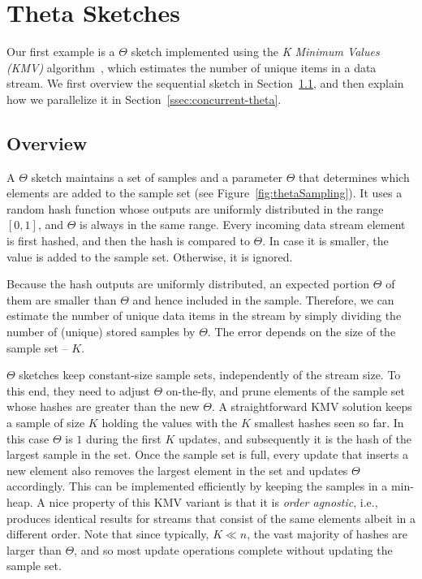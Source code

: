 \section{Theta Sketches}
\label{sec:theta}

Our first example is a $\Theta$ sketch implemented using  the 
\emph{K Minimum Values  (KMV)} algorithm~\cite{KMV}, 
which estimates the number of unique items in a data stream. 
We first overview the sequential  sketch in Section~\ref{ssec:theta-overview}, 
and then explain how we parallelize it in Section~\ref{ssec:concurrent-theta}.

\subsection{Overview}
\label{ssec:theta-overview}


A $\Theta$ sketch maintains a set of samples and a parameter $\Theta$
that determines which elements are added to the sample set (see Figure~\ref{fig:thetaSampling}). 
It uses a random hash function whose outputs are uniformly distributed
in the range $[0,1]$, and $\Theta$ is always in the same range.  
Every incoming data stream element is first hashed, and then the hash is compared to $\Theta$. 
In case it is smaller, the value is added to the sample set.  Otherwise, it is ignored. 

Because the hash outputs are uniformly distributed, an expected
portion $\Theta$ of them are smaller than $\Theta$ and hence included in the sample. 
Therefore, we can estimate the number of unique data items in the stream by
simply dividing the number of (unique) stored samples by $\Theta$.
The error depends on the size of the sample set -- $K$. 

 $\Theta$ sketches keep constant-size sample sets, independently of the stream size. 
 To this end, they need to adjust $\Theta$ on-the-fly, and prune elements of 
 the sample set whose hashes are greater than the new $\Theta$.
A straightforward KMV solution keeps a sample of size $K$ 
holding the  values with the $K$ smallest hashes seen so far. 
In this case $\Theta$ is $1$ during the first $K$ updates, and 
subsequently it is the hash of the largest sample in the set.
Once the sample set is full,
every update that inserts  a new element also removes the largest
element in the set and updates $\Theta$ accordingly. 
This can be implemented efficiently by keeping the samples in  a min-heap. 
A nice property of this KMV variant is that it is \emph{order agnostic}, i.e., produces 
identical results for streams that consist of the same elements albeit in a different order.
Note that since typically, $K \ll n$, the vast majority of hashes are larger than 
$\Theta$,  and so most update operations complete without updating the sample set. 


